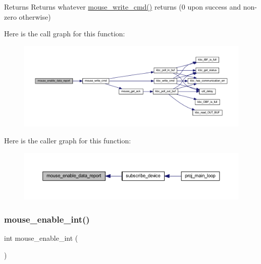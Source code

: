 \begin{DoxyReturn}{Returns}
Returns whatever \mbox{\hyperlink{group__mouse_ga14261d6dca45cb7cc9c8a786739ac5a3}{mouse\+\_\+write\+\_\+cmd()}} returns (0 upon success and non-\/zero otherwise) 
\end{DoxyReturn}
Here is the call graph for this function\+:\nopagebreak
\begin{figure}[H]
\begin{center}
\leavevmode
\includegraphics[width=350pt]{group__mouse_ga108813d01ba189cc8bb0dca728c932a8_cgraph}
\end{center}
\end{figure}
Here is the caller graph for this function\+:\nopagebreak
\begin{figure}[H]
\begin{center}
\leavevmode
\includegraphics[width=350pt]{group__mouse_ga108813d01ba189cc8bb0dca728c932a8_icgraph}
\end{center}
\end{figure}
\mbox{\label{group__mouse_gaf19e0109275a1162be7188deb9c02b41}} 
\subsubsection{\texorpdfstring{mouse\+\_\+enable\+\_\+int()}{mouse\_enable\_int()}}
{\footnotesize\ttfamily int mouse\+\_\+enable\+\_\+int (\begin{DoxyParamCaption}{ }\end{DoxyParamCaption})}



